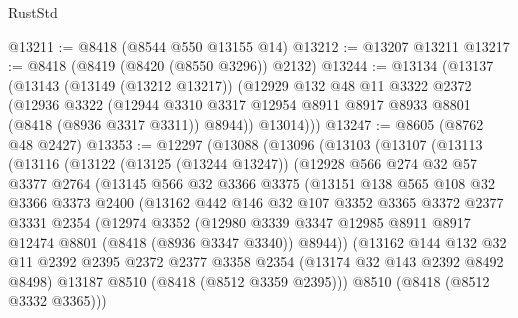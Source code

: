 \begin{lexlean}{RustStd}
\begin{coremodule}
@13211 := @8418 (@8544 @550 @13155 @14)
@13212 := @13207 @13211
@13217 := @8418 (@8419 (@8420 (@8550 @3296)) @2132)
@13244 := @13134
    (@13137
      (@13143
        (@13149 (@13212 @13217))
        (@12929
          @132
          @48
          @11
          @3322
          @2372
          (@12936
            @3322
            (@12944 @3310 @3317 @12954 @8911 @8917 @8933 @8801 (@8418 (@8936 @3317 @3311)) @8944))
          @13014)))
@13247 := @8605 (@8762 @48 @2427)
@13353 := @12297
    (@13088
      (@13096
        (@13103
          (@13107
            (@13113
              (@13116
                (@13122
                  (@13125 (@13244 @13247))
                  (@12928
                    @566
                    @274
                    @32
                    @57
                    @3377
                    @2764
                    (@13145
                      @566
                      @32
                      @3366
                      @3375
                      (@13151
                        @138
                        @565
                        @108
                        @32
                        @3366
                        @3373
                        @2400
                        (@13162
                          @442
                          @146
                          @32
                          @107
                          @3352
                          @3365
                          @3372
                          @2377
                          @3331
                          @2354
                          (@12974
                            @3352
                            (@12980
                              @3339
                              @3347
                              @12985
                              @8911
                              @8917
                              @12474
                              @8801
                              (@8418 (@8936 @3347 @3340))
                              @8944))
                          (@13162
                            @144
                            @132
                            @32
                            @11
                            @2392
                            @2395
                            @2372
                            @2377
                            @3358
                            @2354
                            (@13174 @32 @143 @2392 @8492 @8498)
                            @13187
                            @8510
                            (@8418 (@8512 @3359 @2395)))
                          @8510
                          (@8418 (@8512 @3332 @3365)))

\end{coremodule}
\end{lexlean}
